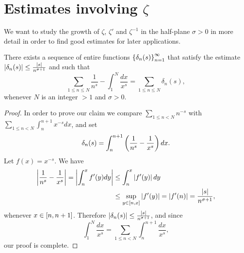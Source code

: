 \section{Estimates involving $\zeta$}
We want to study the growth of $\zeta$, $\zeta'$ and $\zeta^{-1}$ in the half-plane $\sigma > 0$ in more detail in order to find good estimates for later applications.

\begin{proposition}
	There exists a sequence of entire functions $\left\{\delta_n(s)\right\} _{n = 1} ^\infty$ that satisfy the estimate $\left|\delta_n(s)\right| \leq \frac{\left|s\right|}{n^{\sigma + 1}}$ and such that
\begin{equation}\label{equ:SumDelta}
	\sum _{1 \leq n \leq N} \frac{1}{n^s} - \int _1 ^N \frac{dx}{x^s} = \sum _{1 \leq n \leq N} \delta_n(s),
\end{equation}
	whenever $N$ is an integer $> 1$ and $\sigma > 0$.
\end{proposition}
\begin{proof}
	In order to prove our claim we compare $\sum _{1 \leq n < N} n^{-s}$ with $\sum _{1 \leq n < N} \int _n ^{n + 1} x^{-s} dx$, and set
\begin{equation*}
	\delta_n(s) = \int _n ^{n + 1} \left(\frac{1}{n^s} - \frac{1}{x^s}\right) dx.
\end{equation*}
	Let $f(x) = x^{-s}$. We have
\begin{equation*}
\begin{aligned}	
	\left|\frac{1}{n^s} - \frac{1}{x^s}\right| = \left|\int _n ^x f'(y) dy\right| 
	&\leq \int _n ^x \left|f'(y)\right| dy \\
	&\leq \sup _{y \in \left[n, x\right]} \left|f'(y)\right| = \left|f'(n)\right| = \frac{\left|s\right|}{n^{\sigma + 1}},
\end{aligned}
\end{equation*}
	whenever $x \in \left[n, n + 1\right]$. Therefore $\left|\delta_n(s)\right| \leq \frac{\left|s\right|}{n^{\sigma + 1}}$, and since
\begin{equation*}
	\int _1 ^N \frac{dx}{x^s} = \sum _{1 \leq n < N} \int _n ^{n + 1} \frac{dx}{x^s},
\end{equation*}
	our proof is complete.
\end{proof}



